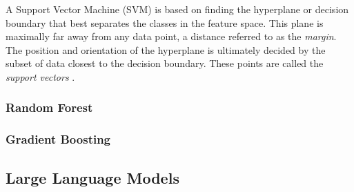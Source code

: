 A Support Vector Machine (SVM) is based on finding the hyperplane or decision boundary that best separates the classes in the feature space. This plane is maximally far away from any data point, a distance referred to as the \textit{margin}. The position and orientation of the hyperplane is ultimately decided by the subset of data closest to the decision boundary. These points are called the \textit{support vectors} \cite{Manning2008}. 

\subsubsection{Random Forest}



\subsubsection{Gradient Boosting}

\subsection{Large Language Models}




